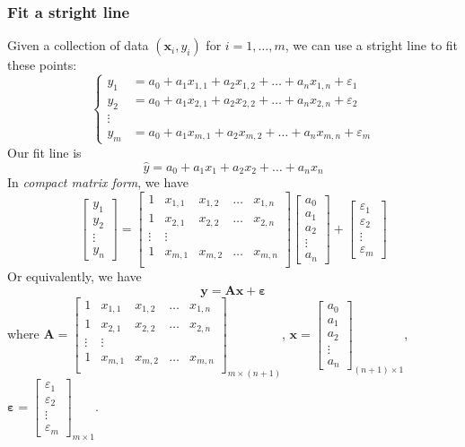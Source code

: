 \subsubsection{Fit a stright line}
Given a collection of data $(\bm x_i,y_i)$ for $i=1,\dots,m$, we can use a stright line to fit these points:
\[
\left\{
\begin{aligned}
y_1&=a_0+a_1x_{1,1}+a_2x_{1,2}+\dots+a_nx_{1,n}+\varepsilon_1\\
y_2&=a_0+a_1x_{2,1}+a_2x_{2,2}+\dots+a_nx_{2,n}+\varepsilon_2\\
\vdots\\
y_m&=a_0+a_1x_{m,1}+a_2x_{m,2}+\dots+a_nx_{m,n}+\varepsilon_m
\end{aligned}
\right.
\]
Our fit line is 
\[
\hat y=a_0+a_1x_1+a_2x_2+\dots+a_nx_n
\]
In \textit{compact matrix form}, we have
\[
\begin{bmatrix}
y_1\\y_2\\\vdots\\y_n
\end{bmatrix}
=\begin{bmatrix}
1&x_{1,1}&x_{1,2}&\dots&x_{1,n}\\
1&x_{2,1}&x_{2,2}&\dots&x_{2,n}\\
\vdots&\vdots&&&\\
1&x_{m,1}&x_{m,2}&\dots&x_{m,n}\\
\end{bmatrix}\begin{bmatrix}
a_0\\a_1\\a_2\\\vdots\\a_{n}
\end{bmatrix}+\begin{bmatrix}
\varepsilon_1\\\varepsilon_2\\\vdots\\\varepsilon_m
\end{bmatrix}
\]
Or equivalently, we have 
\[
\bm y=\bm{Ax}+\bm \varepsilon
\]
where $\bm A =\begin{bmatrix}
1&x_{1,1}&x_{1,2}&\dots&x_{1,n}\\
1&x_{2,1}&x_{2,2}&\dots&x_{2,n}\\
\vdots&\vdots&&&\\
1&x_{m,1}&x_{m,2}&\dots&x_{m,n}\\
\end{bmatrix}_{m\times (n+1)}$, $\bm x=\begin{bmatrix}
a_0\\a_1\\a_2\\\vdots\\a_{n}
\end{bmatrix}_{(n+1)\times 1}$, $\bm \varepsilon=\begin{bmatrix}
\varepsilon_1\\\varepsilon_2\\\vdots\\\varepsilon_m
\end{bmatrix}_{m\times 1}$.\\
